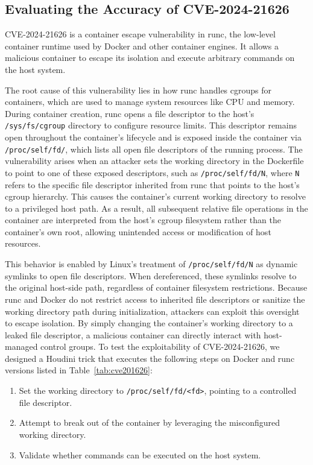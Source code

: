 \documentclass[12pt]{report}
\begin{document}
\fontsize{12pt}{14pt} \selectfont
\begin{doublespace}




\section{Evaluating the Accuracy of CVE-2024-21626}
\label{sec:CVE-2024-21626}
CVE-2024-21626 \cite{runc-cve-2024-21626} is a container escape vulnerability in runc, the low-level container runtime used by Docker and other container engines. It allows a malicious container to escape its isolation and execute arbitrary commands on the host system.

The root cause of this vulnerability lies in how runc handles cgroups for containers, which are used to manage system resources like CPU and memory. During container creation, runc opens a file descriptor to the host's \texttt{/sys/fs/cgroup} directory to configure resource limits. This descriptor remains open throughout the container’s lifecycle and is exposed inside the container via \texttt{/proc/self/fd/}, which lists all open file descriptors of the running process. The vulnerability arises when an attacker sets the working directory in the Dockerfile to point to one of these exposed descriptors, such as \texttt{/proc/self/fd/N}, where \texttt{N} refers to the specific file descriptor inherited from runc that points to the host’s cgroup hierarchy. This causes the container’s current working directory to resolve to a privileged host path. As a result, all subsequent relative file operations in the container are interpreted from the host’s cgroup filesystem rather than the container’s own root, allowing unintended access or modification of host resources.

This behavior is enabled by Linux's treatment of \texttt{/proc/self/fd/N} as dynamic symlinks to open file descriptors. When dereferenced, these symlinks resolve to the original host-side path, regardless of container filesystem restrictions. Because runc and Docker do not restrict access to inherited file descriptors or sanitize the working directory path during initialization, attackers can exploit this oversight to escape isolation. By simply changing the container's working directory to a leaked file descriptor, a malicious container can directly interact with host-managed control groups.
To test the exploitability of CVE-2024-21626, we designed a Houdini trick that executes the following steps on Docker and runc versions listed in Table~\ref{tab:cve201626}:
\begin{enumerate}
    \item Set the working directory to \texttt{/proc/self/fd/<fd>}, pointing to a controlled file descriptor.
    \item Attempt to break out of the container by leveraging the misconfigured working directory.
    \item Validate whether commands can be executed on the host system.
\end{enumerate}


\end{doublespace}
\end{document}

